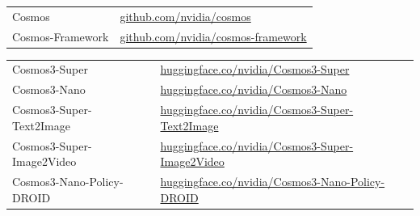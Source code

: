 \vspace{8mm}

\begin{tcolorbox}[
    colback=black!2,
    colframe=nvidiagreen!75!white,
    boxrule=0.4pt,
    arc=1pt,
    left=4pt,
    right=4pt,
    top=4pt,
    bottom=4pt,
    title=Open-Source Code
]
\small
\begin{tabular}{p{4.5cm}l}
Cosmos & {\normalfont\scriptsize\href{https://github.com/nvidia/cosmos}{github.com/nvidia/cosmos}} \\
Cosmos-Framework & {\normalfont\scriptsize\href{https://github.com/nvidia/cosmos-framework}{github.com/nvidia/cosmos-framework}} \\
\end{tabular}
\end{tcolorbox}

\begin{tcolorbox}[
    colback=black!2,
    colframe=nvidiagreen!75!white,
    boxrule=0.4pt,
    arc=1pt,
    left=4pt,
    right=4pt,
    top=4pt,
    bottom=4pt,
    title=Open-Weight Model Checkpoint
]
\small
\begin{tabular}{p{4.5cm}l}
Cosmos3-Super & {\normalfont\scriptsize\href{https://huggingface.co/nvidia/Cosmos3-Super}{huggingface.co/nvidia/Cosmos3-Super}} \\
Cosmos3-Nano & {\normalfont\scriptsize\href{https://huggingface.co/nvidia/Cosmos3-Nano}{huggingface.co/nvidia/Cosmos3-Nano}} \\
Cosmos3-Super-Text2Image & {\normalfont\scriptsize\href{https://huggingface.co/nvidia/Cosmos3-Super-Text2Image}{huggingface.co/nvidia/Cosmos3-Super-Text2Image}} \\
Cosmos3-Super-Image2Video & {\normalfont\scriptsize\href{https://huggingface.co/nvidia/Cosmos3-Super-Image2Video}{huggingface.co/nvidia/Cosmos3-Super-Image2Video}} \\
Cosmos3-Nano-Policy-DROID & {\normalfont\scriptsize\href{https://huggingface.co/nvidia/Cosmos3-Nano-Policy-DROID}{huggingface.co/nvidia/Cosmos3-Nano-Policy-DROID}} \\
\end{tabular}
\end{tcolorbox}


